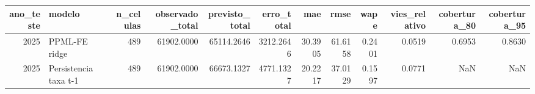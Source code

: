 \begin{tabular}{rlrrrrrrrrrr}
\toprule
ano_teste & modelo & n_celulas & observado_total & previsto_total & erro_total & mae & rmse & wape & vies_relativo & cobertura_80 & cobertura_95 \\
\midrule
2025 & PPML-FE ridge & 489 & 61902.0000 & 65114.2646 & 3212.2646 & 30.3905 & 61.6158 & 0.2401 & 0.0519 & 0.6953 & 0.8630 \\
2025 & Persistencia taxa t-1 & 489 & 61902.0000 & 66673.1327 & 4771.1327 & 20.2217 & 37.0129 & 0.1597 & 0.0771 & NaN & NaN \\
\bottomrule
\end{tabular}
